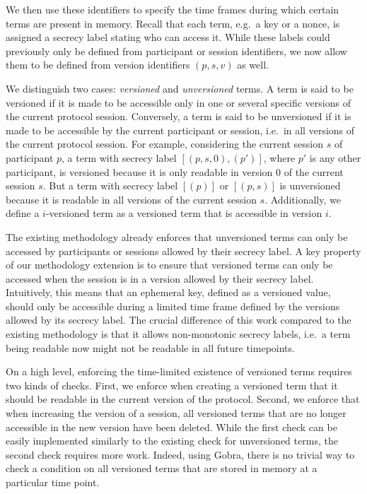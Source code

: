 We then use these identifiers to specify the time frames during which certain terms are present in memory.
Recall that each term, e.g.\  a key or a nonce, is assigned a secrecy label stating who can access it. While these labels could previously only be defined from participant or session identifiers, we now allow them to be defined from version identifiers $(p, s, v)$ as well.

We distinguish two cases: \emph{versioned} and \emph{unversioned} terms.
A term is said to be versioned if it is made to be accessible only in one or several specific versions of the current protocol session.
Conversely, a term is said to be unversioned if it is made to be accessible by the current participant or session, i.e.\ in all versions of the current protocol session.
For example, considering the current session $s$ of participant $p$, a term with secrecy label $[(p, s, 0), (p')]$, where $p'$ is any other participant, is versioned because it is only readable in version $0$ of the current session $s$. But a term with secrecy label $[(p)]$ or $[(p, s)]$ is unversioned because it is readable in all versions of the current session $s$.
Additionally, we define a $i$-versioned term as a versioned term that is accessible in version $i$.

The existing methodology already enforces that unversioned terms can only be accessed by participants or sessions allowed by their secrecy label.
A key property of our methodology extension is to ensure that versioned terms can only be accessed when the session is in a version allowed by their secrecy label. Intuitively, this means that an ephemeral key, defined as a versioned value, should only be accessible during a limited time frame defined by the versions allowed by its secrecy label.
The crucial difference of this work compared to the existing methodology is that it allows non-monotonic secrecy labels, i.e.\ a term being readable now might not be readable in all future timepoints.

On a high level, enforcing the time-limited existence of versioned terms requires two kinds of checks.
First, we enforce when creating a versioned term that it should be readable in the current version of the protocol.
Second, we enforce that when increasing the version of a session, all versioned terms that are no longer accessible in the new version have been deleted.
While the first check can be easily implemented similarly to the existing check for unversioned terms, the second check requires more work. Indeed, using Gobra, there is no trivial way to check a condition on all versioned terms that are stored in memory at a particular time point.

